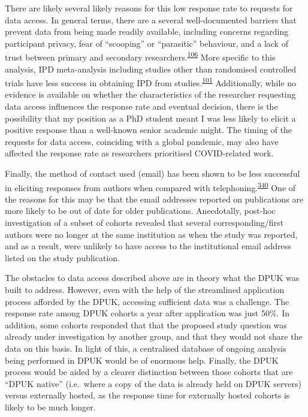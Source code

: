 \documentclass[a4paper, twoside]{templates/ociamthesis}
\begin{document}
There are likely several likely reasons for this low response rate to requests for data access. In general terms, there are a several well-documented barriers that prevent data from being made readily available, including concerns regarding participant privacy, fear of ``scooping'' or ``parasitic'' behaviour, and a lack of trust between primary and secondary researchers.\textsuperscript{\protect\hyperlink{ref-vanpanhuis2014}{106}} More specific to this analysis, IPD meta-analysis including studies other than randomised controlled trials have less success in obtaining IPD from studies.\textsuperscript{\protect\hyperlink{ref-nevitt2017}{101}} Additionally, while no evidence is available on whether the characteristics of the researcher requesting data access influences the response rate and eventual decision, there is the possibility that my position as a PhD student meant I was less likely to elicit a positive response than a well-known senior academic might. The timing of the requests for data access, coinciding with a global pandemic, may also have affected the response rate as researchers prioritised COVID-related work.

Finally, the method of contact used (email) has been shown to be less successful in eliciting responses from authors when compared with telephoning.\textsuperscript{\protect\hyperlink{ref-danko2019}{340}} One of the reasons for this may be that the email addresses reported on publications are more likely to be out of date for older publications. Anecdotally, post-hoc investigation of a subset of cohorts revealed that several corresponding/first authors were no longer at the same institution as when the study was reported, and as a result, were unlikely to have access to the institutional email address listed on the study publication.

The obstacles to data access described above are in theory what the DPUK was built to address. However, even with the help of the streamlined application process afforded by the DPUK, accessing sufficient data was a challenge. The response rate among DPUK cohorts a year after application was just 50\%. In addition, some cohorts responded that that the proposed study question was already under investigation by another group, and that they would not share the data on this basis. In light of this, a centralised database of ongoing analysis being performed in DPUK would be of enormous help. Finally, the DPUK process would be aided by a clearer distinction between those cohorts that are ``DPUK native'' (i.e.~where a copy of the data is already held on DPUK servers) versus externally hosted, as the response time for externally hosted cohorts is likely to be much longer.
\end{document}

